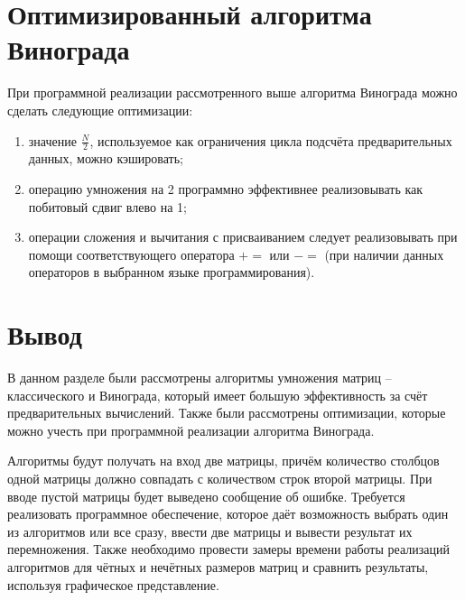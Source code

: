 \section{Оптимизированный алгоритма Винограда}

При программной реализации рассмотренного выше алгоритма Винограда можно сделать следующие оптимизации:
\begin{enumerate}
	\item значение $\frac{N}{2}$, используемое как ограничения цикла подсчёта предварительных данных, можно кэшировать;
	\item операцию умножения на 2 программно эффективнее реализовывать как побитовый сдвиг влево на 1;
	\item операции сложения и вычитания с присваиванием следует реализовывать при помощи соответствующего оператора $+=$ или $-=$ (при наличии данных операторов в выбранном языке программирования).
\end{enumerate}

\section*{Вывод}
В данном разделе были рассмотрены алгоритмы умножения матриц – классического и Винограда, который имеет большую эффективность за счёт предварительных вычислений. Также были рассмотрены оптимизации, которые можно учесть при программной реализации алгоритма Винограда.

Алгоритмы будут получать на вход две матрицы, причём количество столбцов одной матрицы должно совпадать с количеством строк второй матрицы. При вводе пустой матрицы будет выведено сообщение об ошибке. Требуется реализовать программное обеспечение, которое даёт возможность выбрать один из алгоритмов или все сразу, ввести две матрицы и вывести результат их перемножения. Также необходимо провести замеры времени работы реализаций алгоритмов для чётных и нечётных размеров матриц и сравнить результаты, используя графическое представление.
